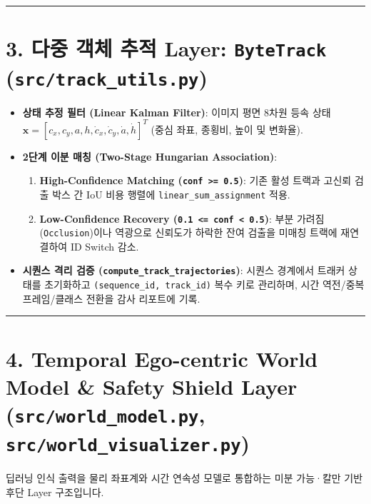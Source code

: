 \documentclass[10.5pt,a4paper]{article}
\begin{document}
\par\noindent\rule{\textwidth}{0.4pt}\par\medskip

\section{3. 다중 객체 추적 Layer: \texttt{ByteTrack} (\texttt{src/\allowbreak{}track\_\allowbreak{}utils.\allowbreak{}py})}

\begin{itemize}[leftmargin=1.5em,itemsep=2pt]
\item \textbf{상태 추정 필터 (Linear Kalman Filter)}: 이미지 평면 8차원 등속 상태 $\mathbf{x} = [c_x, c_y, a, h, \dot{c}_x, \dot{c}_y, \dot{a}, \dot{h}]^T$ (중심 좌표, 종횡비, 높이 및 변화율).
\item \textbf{2단계 이분 매칭 (Two-Stage Hungarian Association)}:
\begin{enumerate}[leftmargin=1.8em,itemsep=2pt]
\item \textbf{High-Confidence Matching (\texttt{conf >= 0.\allowbreak{}5})}: 기존 활성 트랙과 고신뢰 검출 박스 간 IoU 비용 행렬에 \texttt{linear\_\allowbreak{}sum\_\allowbreak{}assignment} 적용.
\item \textbf{Low-Confidence Recovery (\texttt{0.\allowbreak{}1 <= conf < 0.\allowbreak{}5})}: 부분 가려짐(\texttt{Occlusion})이나 역광으로 신뢰도가 하락한 잔여 검출을 미매칭 트랙에 재연결하여 ID Switch 감소.
\end{enumerate}
\item \textbf{시퀀스 격리 검증 (\texttt{compute\_\allowbreak{}track\_\allowbreak{}trajectories})}: 시퀀스 경계에서 트래커 상태를 초기화하고 \texttt{(sequence\_\allowbreak{}id,\allowbreak{} track\_\allowbreak{}id)} 복수 키로 관리하며, 시간 역전/중복 프레임/클래스 전환을 감사 리포트에 기록.
\end{itemize}

\par\noindent\rule{\textwidth}{0.4pt}\par\medskip

\section{4. Temporal Ego-centric World Model \& Safety Shield Layer (\texttt{src/\allowbreak{}world\_\allowbreak{}model.\allowbreak{}py}, \texttt{src/\allowbreak{}world\_\allowbreak{}visualizer.\allowbreak{}py})}

딥러닝 인식 출력을 물리 좌표계와 시간 연속성 모델로 통합하는 미분 가능·칼만 기반 후단 Layer 구조입니다.
\end{document}
